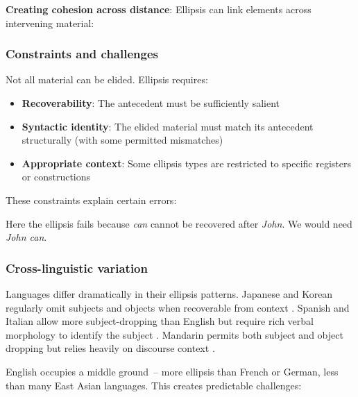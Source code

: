 \textbf{Creating cohesion across distance}: Ellipsis can link elements across intervening material:

\z

\subsubsection*{Constraints and challenges}

Not all material can be elided. Ellipsis requires:
\begin{itemize}[noitemsep]
\item \textbf{Recoverability}: The antecedent must be sufficiently salient 
\item \textbf{Syntactic identity}: The elided material must match its antecedent structurally (with some permitted mismatches) 
\item \textbf{Appropriate context}: Some ellipsis types are restricted to specific registers or constructions 
\end{itemize}

These constraints explain certain errors:

\z
Here the ellipsis fails because \textit{can} cannot be recovered after \textit{John}. We would need \textit{John can}.

\subsubsection*{Cross-linguistic variation}

Languages differ dramatically in their ellipsis patterns. Japanese and Korean regularly omit subjects and objects when recoverable from context \citep{Kuno1973}. Spanish and Italian allow more subject-dropping than English but require rich verbal morphology to identify the subject \citep{JaeggliSafir1989}. Mandarin permits both subject and object dropping but relies heavily on discourse context \citep{li_thompson_1979}.

English occupies a middle ground~-- more ellipsis than French or German, less than many East Asian languages. This creates predictable challenges:

